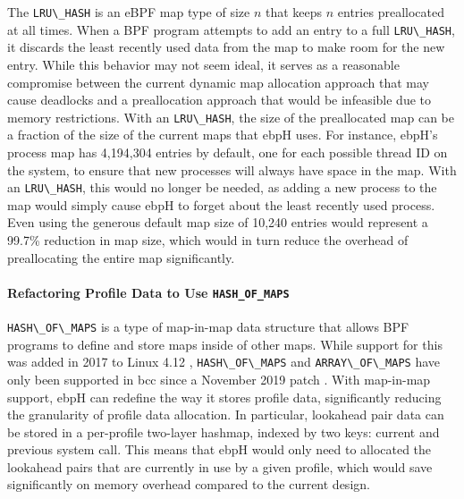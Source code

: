\documentclass[
  12pt]{findlay}
\newcommand{\passthrough}[1]{#1}
\begin{document}
The \passthrough{\lstinline!LRU\_HASH!} \autocite{bcc,gregg19bpf} is an
eBPF map type of size \(n\) that keeps \(n\) entries preallocated at all
times. When a BPF program attempts to add an entry to a full
\passthrough{\lstinline!LRU\_HASH!}, it discards the least recently used
data from the map to make room for the new entry. While this behavior
may not seem ideal, it serves as a reasonable compromise between the
current dynamic map allocation approach that may cause deadlocks and a
preallocation approach that would be infeasible due to memory
restrictions. With an \passthrough{\lstinline!LRU\_HASH!}, the size of
the preallocated map can be a fraction of the size of the current maps
that ebpH uses. For instance, ebpH's process map has 4,194,304 entries
by default, one for each possible thread ID on the system, to ensure
that new processes will always have space in the map. With an
\passthrough{\lstinline!LRU\_HASH!}, this would no longer be needed, as
adding a new process to the map would simply cause ebpH to forget about
the least recently used process. Even using the generous default map
size of 10,240 entries would represent a 99.7\% reduction in map size,
which would in turn reduce the overhead of preallocating the entire map
significantly.

\hypertarget{refactoring-profile-data-to-use-hash_of_maps}{%
\paragraph{\texorpdfstring{Refactoring Profile Data to Use
\texttt{HASH\_OF\_MAPS}}{Refactoring Profile Data to Use HASH\_OF\_MAPS}}\label{refactoring-profile-data-to-use-hash_of_maps}}

\passthrough{\lstinline!HASH\_OF\_MAPS!} \autocite{bcc,gregg19bpf} is a
type of map-in-map data structure that allows BPF programs to define and
store maps inside of other maps. While support for this was added in
2017 to Linux 4.12 \autocite{lau17},
\passthrough{\lstinline!HASH\_OF\_MAPS!} and
\passthrough{\lstinline!ARRAY\_OF\_MAPS!} have only been supported in
bcc \autocite{bcc} since a November 2019 patch \autocite{song19}. With
map-in-map support, ebpH can redefine the way it stores profile data,
significantly reducing the granularity of profile data allocation. In
particular, lookahead pair data can be stored in a per-profile two-layer
hashmap, indexed by two keys: current and previous system call. This
means that ebpH would only need to allocated the lookahead pairs that
are currently in use by a given profile, which would save significantly
on memory overhead compared to the current design.
\end{document}
